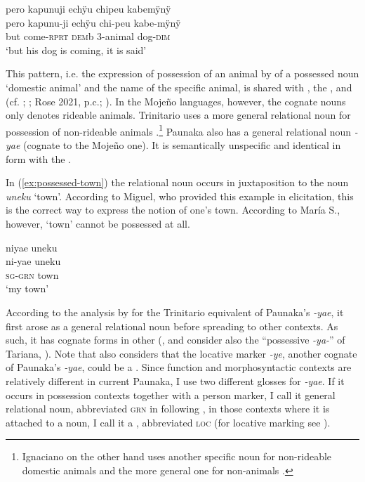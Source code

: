 \ea\label{ex:aniposs-1}
\begingl
\glpreamble pero kapunuji echÿu chipeu kabemÿnÿ\\
\gla pero kapunu-ji echÿu chi-peu kabe-mÿnÿ\\
\glb but come-\textsc{rprt} \textsc{dem}b 3-animal dog-\textsc{dim}\\
\glft ‘but his dog is coming, it is said’
\endgl
\trailingcitation{[mtx-a110906l.147]}
\xe


This pattern, i.e. the expression of possession of an animal by  of a possessed noun ‘domestic animal’ and the name of the specific animal, is shared with , the , and  (cf. \citealt[50]{ButlerEkdahl2012}; \citealt[51]{OlzaZubiri2004}; Rose 2021, p.c.; \citealt[123--124]{Danielsen2007}). In the Mojeño languages, however, the cognate nouns only denotes rideable animals. Trinitario uses a more general relational noun for possession of non-rideable animals \citep[cf.][79]{Rose2014}.\footnote{Ignaciano on the other hand uses another specific noun for non-rideable domestic animals and the more general one for non-animals \citep[51]{OlzaZubiri2004}.} Paunaka also has a general relational noun \textit{-yae} (cognate to the Mojeño one). It is semantically unspecific and identical in form with the . 

In (\ref{ex:possessed-town}) the relational noun occurs in juxtaposition to the noun \textit{uneku} ‘town’. According to Miguel, who provided this example in elicitation, this is the correct way to express the notion of one’s town. According to María S., however, ‘town’ cannot be possessed at all.

\ea\label{ex:possessed-town}
\begingl 
\glpreamble niyae uneku\\
\gla ni-yae uneku\\ 
\textsc{sg}-\textsc{grn} town\\ 
\glft ‘my town’
\trailingcitation{[mxx-e181017l]}
\xe

According to the analysis by \citet[]{Rose2019a} for the Trinitario equivalent of Paunaka’s \textit{-yae}, it first arose as a general relational noun before spreading to other contexts. As such, it has cognate forms in other  (\citealt[14]{Rose2019a}, and consider also the “possessive \textit{-ya-}” of Tariana, \citealt[134]{Aikhenvald2003}). Note that \citet[150]{Danielsen2007} also considers that the  locative marker \textit{-ye}, another cognate of Paunaka’s \textit{-yae}, could be a . Since function and morphosyntactic contexts are relatively different in current Paunaka, I use two different glosses for \textit{-yae}. If it occurs in possession contexts together with a person marker, I call it general relational noun, abbreviated \textsc{grn} in following \citet[]{Rose2019a}, in those contexts where it is attached to a noun, I call it a , abbreviated \textsc{loc} (for locative marking see ).

